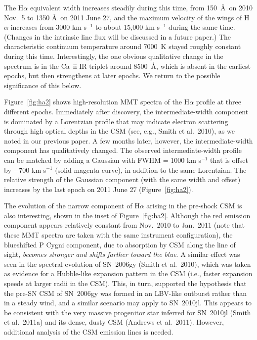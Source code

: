 \documentclass{emulateapj}
\begin{document}
The H$\alpha$ equivalent width increases steadily during this time,
from 150~\AA \ on 2010 Nov.\ 5 to 1350 \AA \ on 2011 June 27, and the
maximum velocity of the wings of H$\alpha$ increases from 3000 km
s$^{-1}$ to about 15,000 km s$^{-1}$ during the same time.  (Changes
in the intrinsic line flux will be discussed in a future paper.)  The
characteristic continuum temperature around 7000~K stayed roughly
constant during this time.  Interestingly, the one obvious qualitative
change in the spectrum is in the Ca~{\sc ii} IR triplet around 8500~\AA, 
which is absent in the earliest epochs, but then strengthens at
later epochs. We return to the possible significance of this below.

Figure~\ref{fig:ha2} shows high-resolution MMT spectra of the
H$\alpha$ profile at three different epochs.  Immediately after
discovery, the intermediate-width component is dominated by a
Lorentzian profile that may indicate electron scattering through high
optical depths in the CSM (see, e.g., Smith et al.\ 2010), as we noted
in our previous paper.  A few months later, however, the
intermediate-width component has qualitatively changed.  The observed
intermediate-width profile can be matched by adding a Gaussian with
FWHM = 1000 km s$^{-1}$ that is offset by $-$700 km s$^{-1}$ (solid
magenta curve), in addition to the same Lorentzian.  The relative
strength of the Gaussian component (with the same width and offset)
increases by the last epoch on 2011 June 27 (Figure~\ref{fig:ha2}).

The evolution of the narrow component of H$\alpha$ arising in the
pre-shock CSM is also interesting, shown in the inset of
Figure~\ref{fig:ha2}.  Although the red emission component appears
relatively constant from Nov.\ 2010 to Jan.\ 2011 (note that these MMT
spectra are taken with the same instrument configuration), the
blueshifted P Cygni component, due to absorption by CSM along the line
of sight, {\it becomes stronger and shifts farther toward the blue}.
A similar effect was seen in the spectral evolution of SN~2006gy
(Smith et al.\ 2010), which was taken as evidence for a Hubble-like
expansion pattern in the CSM (i.e., faster expansion speeds at larger
radii in the CSM).  This, in turn, supported the hypothesis that the
pre-SN CSM of SN~2006gy was formed in an LBV-like outburst rather than
in a steady wind, and a similar scenario may apply to SN~2010jl.  This
appears to be consistent with the very massive progenitor star
inferred for SN~2010jl (Smith et al.\ 2011a) and its dense, dusty CSM
(Andrews et al.\ 2011).  However, additional analysis of the CSM emission
lines is needed.
\end{document}
